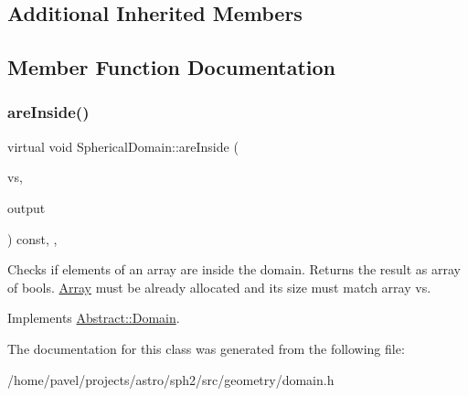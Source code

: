 \subsection*{Additional Inherited Members}


\subsection{Member Function Documentation}
\hypertarget{classSphericalDomain_aa5f4f17ecc1fa454da8b30e55bba98bf}{}\label{classSphericalDomain_aa5f4f17ecc1fa454da8b30e55bba98bf} 
\subsubsection{\texorpdfstring{are\+Inside()}{areInside()}}
{\footnotesize\ttfamily virtual void Spherical\+Domain\+::are\+Inside (\begin{DoxyParamCaption}\item[{const \hyperlink{classArrayView}{Array\+View}$<$ \hyperlink{classBasicVector}{Vector} $>$}]{vs,  }\item[{\hyperlink{classArrayView}{Array\+View}$<$ bool $>$}]{output }\end{DoxyParamCaption}) const\hspace{0.3cm}{\ttfamily [inline]}, {\ttfamily [override]}, {\ttfamily [virtual]}}

Checks if elements of an array are inside the domain. Returns the result as array of bools. \hyperlink{classArray}{Array} must be already allocated and its size must match array vs. 

Implements \hyperlink{classAbstract_1_1Domain_a48ecb4ac3dab5f5a5e2de7b8e8218317}{Abstract\+::\+Domain}.



The documentation for this class was generated from the following file\+:\begin{DoxyCompactItemize}
\item 
/home/pavel/projects/astro/sph2/src/geometry/domain.\+h\end{DoxyCompactItemize}
